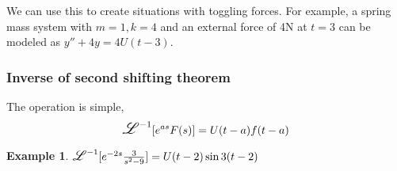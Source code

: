 \documentclass{article}
\newtheorem{example}{Example}
\newcommand\laplace{\mathlarger{\mathlarger{\mathscr{L}}}}
\begin{document}
We can use this to create situations with toggling forces. For example, a 
spring mass system with $m=1,k=4$ and an external force of 4N at $t=3$
can be modeled as $y''+4y=4U(t-3)$.

\subsubsection{Inverse of second shifting theorem}

The operation is simple, $$\laplace^{-1}[e^{as}F(s)]=U(t-a)f(t-a)$$

\begin{example}
	$\laplace^{-1}[e^{-2s}\frac{3}{s^2-9}]=U(t-2)\sin{3(t-2)}$
\end{example}
\end{document}
